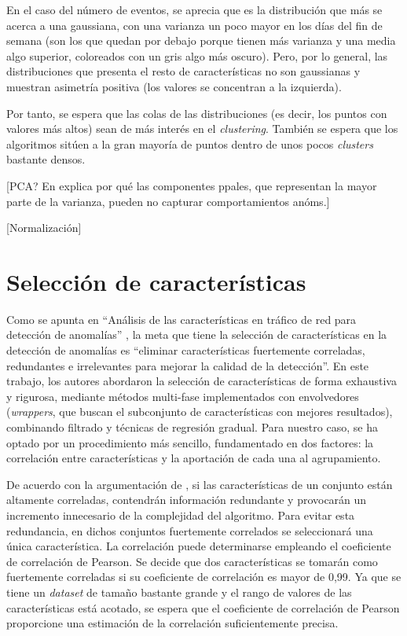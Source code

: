 En el caso del número de eventos, se aprecia que es la distribución que más se acerca a una gaussiana, con una varianza un poco mayor en los días del fin de semana
(son los que quedan por debajo porque tienen más varianza y una media algo superior, coloreados con un gris algo más oscuro).
Pero, por lo general, las distribuciones que presenta el resto de características no son gaussianas y muestran asimetría positiva (los valores se concentran a la izquierda).

Por tanto, se espera que las colas de las distribuciones (es decir, los puntos con valores más altos) sean de más interés en el \emph{clustering}.
También se espera que los algoritmos sitúen a la gran mayoría de puntos dentro de unos pocos \emph{clusters} bastante densos.

[PCA? En \cite{Bohara_2016} explica por qué las componentes ppales, que representan la mayor parte de la varianza, pueden no capturar comportamientos anóms.]

[Normalización]

\section{Selección de características}\label{sec:selecciondecaracteristicas}

Como se apunta en ``Análisis de las características en tráfico de red para detección de anomalías'' \cite{Iglesias_2015},
la meta que tiene la selección de características en la detección de anomalías es
``eliminar características fuertemente correladas, redundantes e irrelevantes para mejorar la calidad de la detección''.
En este trabajo, los autores abordaron la selección de características de forma exhaustiva y rigurosa,
mediante métodos multi-fase implementados con envolvedores (\emph{wrappers}, que buscan el subconjunto de características con mejores resultados),
combinando filtrado y técnicas de regresión gradual.
Para nuestro caso, se ha optado por un procedimiento más sencillo, fundamentado en dos factores: la correlación entre características y la aportación de cada una al agrupamiento.

De acuerdo con la argumentación de \cite{Bohara_2016}, si las características de un conjunto están altamente correladas,
contendrán información redundante y provocarán un incremento innecesario de la complejidad del algoritmo.
Para evitar esta redundancia, en dichos conjuntos fuertemente correlados se seleccionará una única característica.
La correlación puede determinarse empleando el coeficiente de correlación de Pearson.
Se decide que dos características se tomarán como fuertemente correladas si su coeficiente de correlación es mayor de 0,99.
Ya que se tiene un \emph{dataset} de tamaño bastante grande y el rango de valores de las características está acotado,
se espera que el coeficiente de correlación de Pearson proporcione una estimación de la correlación suficientemente precisa.

